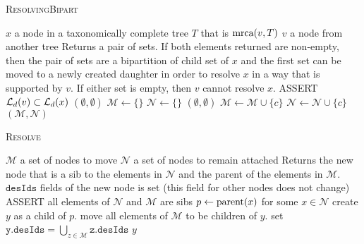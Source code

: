 \documentclass[11pt]{article}
\begin{document}
\begin{algorithm} \caption{\textsc{ResolvingBipart}}\label{AlgResolvingBipart}
\begin{algorithmic}
\REQUIRE $x$ a node in a taxonomically complete tree $T$ that is $\mbox{mrca}(v, T)$
\REQUIRE $v$ a node from another tree
\ENSURE Returns a pair of sets. If both elements returned are non-empty, then 
    the pair of sets are a  bipartition of child set of $x$ and the first set 
    can be moved to a newly created daughter in order to resolve $x$ in 
    a way that is supported by $v$.
    If either set is empty, then  $v$ cannot resolve $x$.
\STATE ASSERT $\mathcal{L}_d(v) \subset \mathcal{L}_d(x)$
    \RETURN $(\emptyset, \emptyset)$ 
\ENDIF
\STATE $\mathcal{M}\leftarrow \{\}$
\STATE $\mathcal{N} \leftarrow \{\}$
            \RETURN $(\emptyset, \emptyset)$ 
        \ENDIF
        $\mathcal{M}\leftarrow \mathcal{M} \cup \{ c\}$
    \ELSE
        $\mathcal{N}\leftarrow \mathcal{N} \cup \{ c\}$
    \ENDIF
\ENDFOR \\
\RETURN $(\mathcal{M}, \mathcal{N})$
\end{algorithmic}
\end{algorithm}

\begin{algorithm} \caption{\textsc{Resolve}}\label{AlgResolve}
\begin{algorithmic}
\REQUIRE $\mathcal{M}$ a set of nodes to move
\REQUIRE $\mathcal{N}$ a set of nodes to remain attached
\ENSURE Returns the new node that is a sib to the elements in $\mathcal{N}$ and the parent of the elements in $\mathcal{M}$.
\ENSURE $\texttt{desIds}$ fields of the new node is set (this field for other nodes does not change)
\STATE ASSERT all elements of $\mathcal{N}$ and $\mathcal{M}$ are sibs
\STATE $p\leftarrow \mbox{parent}(x)$ for some $x\in \mathcal{N}$
\STATE create $y$ as a child of $p$.
\STATE move all elements of $\mathcal{M}$ to be children of $y$.
\STATE set $\texttt{y.desIds} = \bigcup_{z\in\mathcal{M}}\texttt{z.desIds}$
\RETURN $y$
\end{algorithmic}
\end{algorithm}
\end{document}
